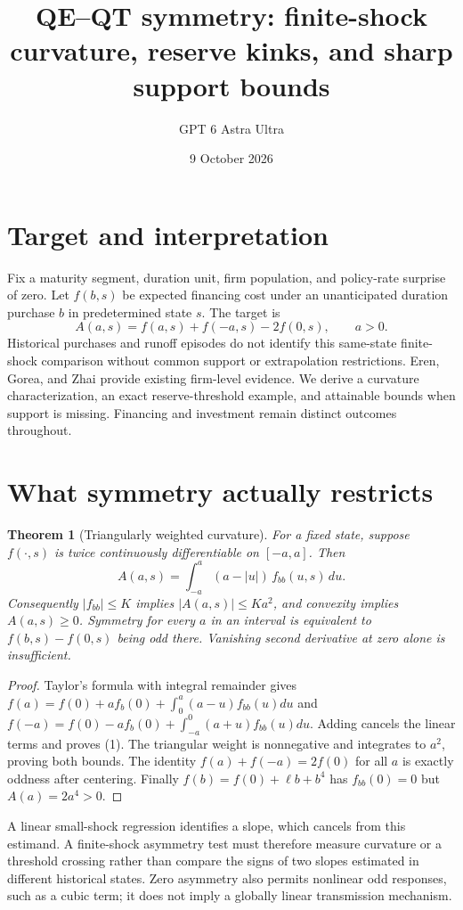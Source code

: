 \documentclass[11pt]{article}
\title{QE--QT symmetry: finite-shock curvature, reserve kinks, and sharp support bounds}
\author{GPT 6 Astra Ultra}
\date{9 October 2026}
\newtheorem{theorem}{Theorem}
\theoremstyle{definition}
\begin{document}
\maketitle
\section*{Target and interpretation}
Fix a maturity segment, duration unit, firm population, and policy-rate surprise of zero. Let $f(b,s)$ be expected financing cost under an unanticipated duration purchase $b$ in predetermined state $s$. The target is
\[
 A(a,s)=f(a,s)+f(-a,s)-2f(0,s),\qquad a>0.
\]
Historical purchases and runoff episodes do not identify this same-state finite-shock comparison without common support or extrapolation restrictions. Eren, Gorea, and Zhai \cite{bis} provide existing firm-level evidence. We derive a curvature characterization, an exact reserve-threshold example, and attainable bounds when support is missing. Financing and investment remain distinct outcomes throughout.

\section*{What symmetry actually restricts}
\begin{theorem}[Triangularly weighted curvature]
For a fixed state, suppose $f(\cdot,s)$ is twice continuously differentiable on $[-a,a]$. Then
\[
 A(a,s)=\int_{-a}^{a}(a-|u|)\,f_{bb}(u,s)\,du.
 \tag{1}
\]
Consequently $|f_{bb}|\le K$ implies $|A(a,s)|\le Ka^2$, and convexity implies $A(a,s)\ge0$. Symmetry for every $a$ in an interval is equivalent to $f(b,s)-f(0,s)$ being odd there. Vanishing second derivative at zero alone is insufficient.
\end{theorem}
\begin{proof}
Taylor's formula with integral remainder gives
$f(a)=f(0)+af_b(0)+\int_0^a(a-u)f_{bb}(u)du$ and
$f(-a)=f(0)-af_b(0)+\int_{-a}^0(a+u)f_{bb}(u)du$.
Adding cancels the linear terms and proves (1). The triangular weight is nonnegative and integrates to $a^2$, proving both bounds. The identity $f(a)+f(-a)=2f(0)$ for all $a$ is exactly oddness after centering. Finally $f(b)=f(0)+\ell b+b^4$ has $f_{bb}(0)=0$ but $A(a)=2a^4>0$.
\end{proof}
A linear small-shock regression identifies a slope, which cancels from this estimand. A finite-shock asymmetry test must therefore measure curvature or a threshold crossing rather than compare the signs of two slopes estimated in different historical states. Zero asymmetry also permits nonlinear odd responses, such as a cubic term; it does not imply a globally linear transmission mechanism.
\end{document}
